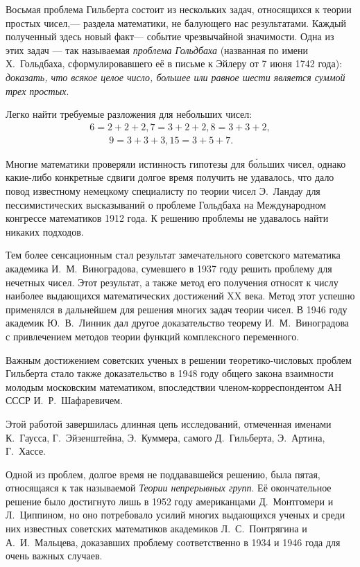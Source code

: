 \documentclass[twocolumn,10pt]{article}
\begin{document}
Восьмая проблема Гильберта состоит из нескольких задач, относящихся к теории простых чисел,--- раздела математики, не балующего нас результатами. Каждый полученный здесь новый факт--- событие чрезвычайной значимости. Одна из этих задач ---  так называемая \emph{проблема Гольдбаха} (названная по имени Х.~Гольдбаха, сформулировавшего её в письме к Эйлеру от 7 июня 1742 года): \emph{доказать, что всякое целое число, большее или равное шести является суммой трех простых}.

Легко найти требуемые разложения для небольших чисел:
$$
  \begin{array}{l}
	6=2+2+2, 7=3+2+2, 8=3+3+2,\\
	\qquad {}9=3+3+3, 15=3+5+7.
  \end{array}
$$

Многие математики проверяли истинность гипотезы для б\'ольших чисел, однако какие-либо конкретные сдвиги долгое время получить не удавалось, что дало повод известному немецкому специалисту по теории чисел Э.~Ландау для пессимистических высказываний о проблеме Гольдбаха на Международном конгрессе математиков 1912 года. К решению проблемы не удавалось найти никаких подходов.

Тем более сенсационным стал результат замечательного советского математика академика И.~М.~Виноградова, сумевшего в 1937 году решить проблему для нечетных чисел. Этот результат, а также метод его получения относят к числу наиболее выдающихся математических достижений XX века. Метод этот успешно применялся в дальнейшем для решения многих задач теории чисел. В 1946 году академик Ю.~В.~Линник дал другое доказательство теорему И.~М.~Виноградова с привлечением методов теории функций комплексного переменного.

Важным достижением советских ученых в решении теоретико-числовых проблем Гильберта стало также доказательство в 1948 году общего закона взаимности молодым московским математиком, впоследствии членом-корреспондентом АН СССР И.~Р.~Шафаревичем.

Этой работой завершилась длинная цепь исследований, отмеченная именами К.~Гаусса, Г.~Эйзенштейна, Э.~Куммера, самого Д.~Гильберта, Э.~Артина, Г.~Хассе.

Одной из проблем, долгое время не поддававшейся решению, была пятая, относящаяся к так называемой \emph{Теории непрерывных групп}. Её окончательное решение было достигнуто лишь в 1952 году американцами Д.~Монтгомери и Л.~Циппином, но оно потребовало усилий многих выдающихся ученых и среди них известных советских математиков академиков Л.~С.~Понтрягина и А.~И.~Мальцева, доказавших проблему соответственно в 1934 и 1946 года для очень важных случаев.
\end{document}
